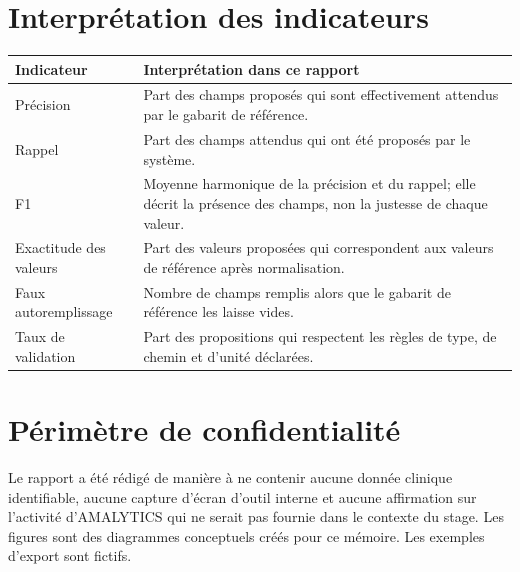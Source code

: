 \section{Interprétation des indicateurs}
\begin{longtable}{p{}p{}}
\toprule
Indicateur & Interprétation dans ce rapport\\
\midrule
Précision & Part des champs proposés qui sont effectivement attendus par le gabarit de référence.\\
Rappel & Part des champs attendus qui ont été proposés par le système.\\
F1 & Moyenne harmonique de la précision et du rappel; elle décrit la présence des champs, non la justesse de chaque valeur.\\
Exactitude des valeurs & Part des valeurs proposées qui correspondent aux valeurs de référence après normalisation.\\
Faux autoremplissage & Nombre de champs remplis alors que le gabarit de référence les laisse vides.\\
Taux de validation & Part des propositions qui respectent les règles de type, de chemin et d'unité déclarées.\\
\bottomrule
\end{longtable}

\section{Périmètre de confidentialité}
Le rapport a été rédigé de manière à ne contenir aucune donnée clinique identifiable, aucune capture d'écran d'outil interne et aucune affirmation sur l'activité d'AMALYTICS qui ne serait pas fournie dans le contexte du stage. Les figures sont des diagrammes conceptuels créés pour ce mémoire. Les exemples d'export sont fictifs.

